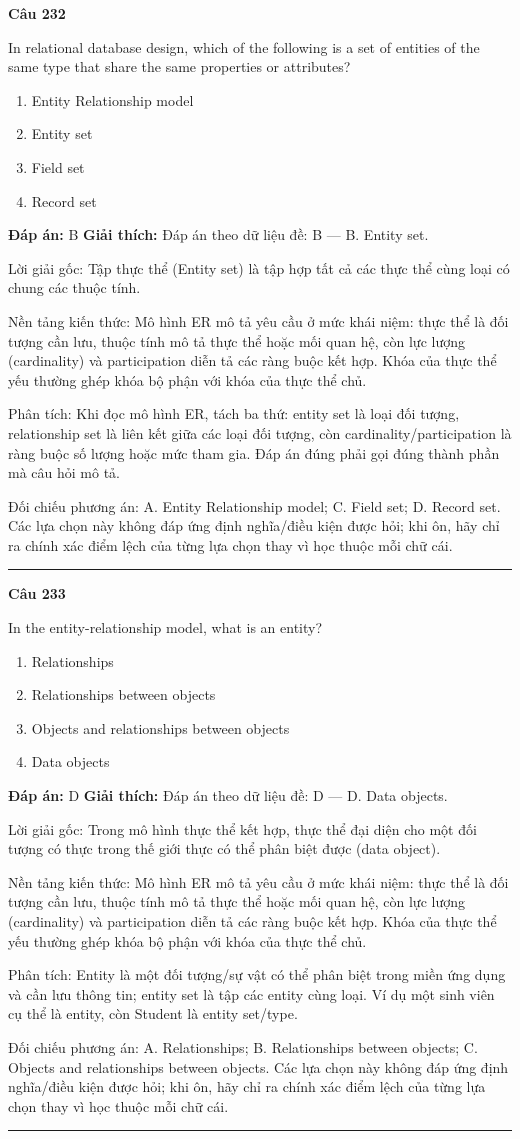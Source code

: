 \documentclass[11pt,a4paper]{article}
\newenvironment{question}[1]{%
  \par\vspace{1em}\noindent\textbf{\large Câu #1}\par\vspace{0.4em}
}{%
  \par\vspace{1em}\hrule\vspace{0.6em}
}
\newenvironment{choices}{%
  \begin{enumerate}[label=\textbf{\Alph*.},leftmargin=2.2em,itemsep=2pt,topsep=3pt]
}{%
  \end{enumerate}
}
\newcommand{\choice}{\item}
\begin{document}
\begin{question}{232}
In relational database design, which of the following is a set of entities of the same type that share the same properties or attributes?
\begin{choices}
\choice Entity Relationship model
\choice Entity set
\choice Field set
\choice Record set
\end{choices}
\textbf{Đáp án:} B
\textbf{Giải thích:} Đáp án theo dữ liệu đề: B — B. Entity set.

Lời giải gốc: Tập thực thể (Entity set) là tập hợp tất cả các thực thể cùng loại có chung các thuộc tính.

Nền tảng kiến thức: Mô hình ER mô tả yêu cầu ở mức khái niệm: thực thể là đối tượng cần lưu, thuộc tính mô tả thực thể hoặc mối quan hệ, còn lực lượng (cardinality) và participation diễn tả các ràng buộc kết hợp. Khóa của thực thể yếu thường ghép khóa bộ phận với khóa của thực thể chủ.

Phân tích: Khi đọc mô hình ER, tách ba thứ: entity set là loại đối tượng, relationship set là liên kết giữa các loại đối tượng, còn cardinality/participation là ràng buộc số lượng hoặc mức tham gia. Đáp án đúng phải gọi đúng thành phần mà câu hỏi mô tả.

Đối chiếu phương án: A. Entity Relationship model; C. Field set; D. Record set. Các lựa chọn này không đáp ứng định nghĩa/điều kiện được hỏi; khi ôn, hãy chỉ ra chính xác điểm lệch của từng lựa chọn thay vì học thuộc mỗi chữ cái.
\end{question}

\begin{question}{233}
In the entity-relationship model, what is an entity?
\begin{choices}
\choice Relationships
\choice Relationships between objects
\choice Objects and relationships between objects
\choice Data objects
\end{choices}
\textbf{Đáp án:} D
\textbf{Giải thích:} Đáp án theo dữ liệu đề: D — D. Data objects.

Lời giải gốc: Trong mô hình thực thể kết hợp, thực thể đại diện cho một đối tượng có thực trong thế giới thực có thể phân biệt được (data object).

Nền tảng kiến thức: Mô hình ER mô tả yêu cầu ở mức khái niệm: thực thể là đối tượng cần lưu, thuộc tính mô tả thực thể hoặc mối quan hệ, còn lực lượng (cardinality) và participation diễn tả các ràng buộc kết hợp. Khóa của thực thể yếu thường ghép khóa bộ phận với khóa của thực thể chủ.

Phân tích: Entity là một đối tượng/sự vật có thể phân biệt trong miền ứng dụng và cần lưu thông tin; entity set là tập các entity cùng loại. Ví dụ một sinh viên cụ thể là entity, còn Student là entity set/type.

Đối chiếu phương án: A. Relationships; B. Relationships between objects; C. Objects and relationships between objects. Các lựa chọn này không đáp ứng định nghĩa/điều kiện được hỏi; khi ôn, hãy chỉ ra chính xác điểm lệch của từng lựa chọn thay vì học thuộc mỗi chữ cái.
\end{question}
\end{document}
